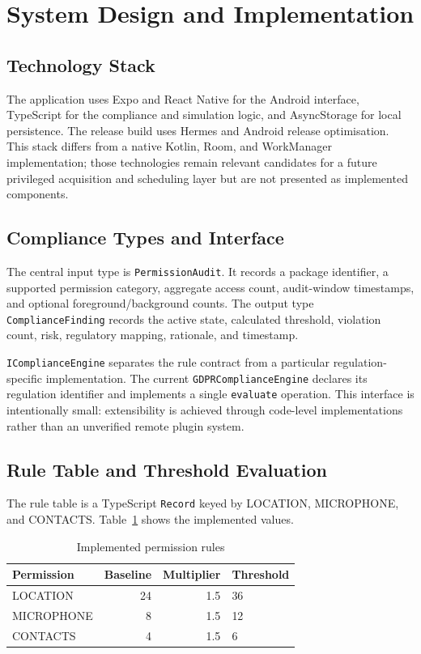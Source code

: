 \newpage
\section{System Design and Implementation}

\subsection{Technology Stack}

The application uses Expo and React Native for the Android interface, TypeScript for the compliance and simulation logic, and AsyncStorage for local persistence. The release build uses Hermes and Android release optimisation. This stack differs from a native Kotlin, Room, and WorkManager implementation; those technologies remain relevant candidates for a future privileged acquisition and scheduling layer but are not presented as implemented components.

\subsection{Compliance Types and Interface}

The central input type is \texttt{PermissionAudit}. It records a package identifier, a supported permission category, aggregate access count, audit-window timestamps, and optional foreground/background counts. The output type \texttt{ComplianceFinding} records the active state, calculated threshold, violation count, risk, regulatory mapping, rationale, and timestamp.

\texttt{IComplianceEngine} separates the rule contract from a particular regulation-specific implementation. The current \texttt{GDPRComplianceEngine} declares its regulation identifier and implements a single \texttt{evaluate} operation. This interface is intentionally small: extensibility is achieved through code-level implementations rather than an unverified remote plugin system.

\subsection{Rule Table and Threshold Evaluation}

The rule table is a TypeScript \texttt{Record} keyed by LOCATION, MICROPHONE, and CONTACTS. Table~\ref{tab:implemented-rules} shows the implemented values.

\begin{table}[H]
\centering
\caption{Implemented permission rules}
\label{tab:implemented-rules}
\begin{tabular}{lrrl}
\toprule
\textbf{Permission} & \textbf{Baseline} & \textbf{Multiplier} & \textbf{Threshold} \\
\midrule
LOCATION & 24 & 1.5 & 36 \\
MICROPHONE & 8 & 1.5 & 12 \\
CONTACTS & 4 & 1.5 & 6 \\
\bottomrule
\end{tabular}
\end{table}

